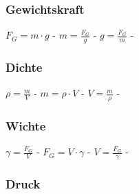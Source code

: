 \subsubsection{Gewichtskraft} 
\begin{minipage}{0.45\textwidth} 
\end{minipage} 
\begin{minipage}{0.45\textwidth} 
 
\legende{}\end{minipage} 
 
$ F_{G}  = m\cdot g $ - $ m = \frac{F_{G} }{g} $ - $ g = \frac{F_{G} }{m} $ - \\ 
 
\subsubsection{Dichte} 
\begin{minipage}{0.45\textwidth} 
\end{minipage} 
\begin{minipage}{0.45\textwidth} 
 
\legende{}\end{minipage} 
 
$ \rho  = \frac{m}{V} $ - $ m = \rho \cdot V $ - $ V = \frac{m}{\rho } $ - \\ 
 
\subsubsection{Wichte} 
\begin{minipage}{0.45\textwidth} 
\end{minipage} 
\begin{minipage}{0.45\textwidth} 
 
\legende{}\end{minipage} 
 
$ \gamma  = \frac{F_{G} }{V} $ - $ F_{G}  = V\cdot \gamma $ - $ V = \frac{F_{G} }{\gamma } $ - \\ 
 
\subsubsection{Druck} 
\begin{minipage}{0.45\textwidth} 
\end{minipage} 
\begin{minipage}{0.45\textwidth} 
 
\legende{}\end{minipage} 
 
